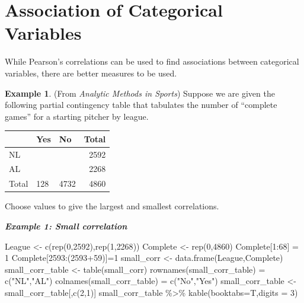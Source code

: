 \documentclass[
  11pt,
]{book}
\newenvironment{Shaded}{\begin{snugshade}}{\end{snugshade}}
\newcommand{\AttributeTok}[1]{\textcolor[rgb]{0.77,0.63,0.00}{#1}}
\newcommand{\DecValTok}[1]{\textcolor[rgb]{0.00,0.00,0.81}{#1}}
\newcommand{\FunctionTok}[1]{\textcolor[rgb]{0.00,0.00,0.00}{#1}}
\newcommand{\NormalTok}[1]{#1}
\newcommand{\OtherTok}[1]{\textcolor[rgb]{0.56,0.35,0.01}{#1}}
\newcommand{\SpecialCharTok}[1]{\textcolor[rgb]{0.00,0.00,0.00}{#1}}
\newcommand{\StringTok}[1]{\textcolor[rgb]{0.31,0.60,0.02}{#1}}
\theoremstyle{definition}
\theoremstyle{definition}
\newtheorem{example}{Example}[chapter]
\theoremstyle{definition}
\theoremstyle{definition}
\theoremstyle{remark}
\begin{document}
\newpage

\hypertarget{association-of-categorical-variables}{%
\section{Association of Categorical Variables}\label{association-of-categorical-variables}}

While Pearson's correlations can be used to find associations between categorical variables, there are better measures to be used.

\begin{example}
(From \emph{Analytic Methods in Sports}) Suppose we are given the following partial contingency table that tabulates the number of ``complete games'' for a starting pitcher by league.

\begin{tabular}{lllr}
\toprule
  & Yes & No & Total\\
\midrule
NL &  &  & 2592\\
AL &  &  & 2268\\
Total & 128 & 4732 & 4860\\
\bottomrule
\end{tabular}

Choose values to give the largest and smallest correlations.
\end{example}

\textbf{\emph{Example 1: Small correlation}}\\

\begin{Shaded}
\begin{Highlighting}[]
\NormalTok{League }\OtherTok{\textless{}{-}} \FunctionTok{c}\NormalTok{(}\FunctionTok{rep}\NormalTok{(}\DecValTok{0}\NormalTok{,}\DecValTok{2592}\NormalTok{),}\FunctionTok{rep}\NormalTok{(}\DecValTok{1}\NormalTok{,}\DecValTok{2268}\NormalTok{))}
\NormalTok{Complete }\OtherTok{\textless{}{-}} \FunctionTok{rep}\NormalTok{(}\DecValTok{0}\NormalTok{,}\DecValTok{4860}\NormalTok{)}
\NormalTok{Complete[}\DecValTok{1}\SpecialCharTok{:}\DecValTok{68}\NormalTok{] }\OtherTok{=} \DecValTok{1}
\NormalTok{Complete[}\DecValTok{2593}\SpecialCharTok{:}\NormalTok{(}\DecValTok{2593}\SpecialCharTok{+}\DecValTok{59}\NormalTok{)]}\OtherTok{=}\DecValTok{1}
\NormalTok{small\_corr }\OtherTok{\textless{}{-}} \FunctionTok{data.frame}\NormalTok{(League,Complete)}
\NormalTok{small\_corr\_table }\OtherTok{\textless{}{-}} \FunctionTok{table}\NormalTok{(small\_corr)}
\FunctionTok{rownames}\NormalTok{(small\_corr\_table) }\OtherTok{=} \FunctionTok{c}\NormalTok{(}\StringTok{"NL"}\NormalTok{,}\StringTok{"AL"}\NormalTok{)}
\FunctionTok{colnames}\NormalTok{(small\_corr\_table) }\OtherTok{=} \FunctionTok{c}\NormalTok{(}\StringTok{"No"}\NormalTok{,}\StringTok{"Yes"}\NormalTok{)}
\NormalTok{small\_corr\_table }\OtherTok{\textless{}{-}}\NormalTok{ small\_corr\_table[,}\FunctionTok{c}\NormalTok{(}\DecValTok{2}\NormalTok{,}\DecValTok{1}\NormalTok{)]}
\NormalTok{small\_corr\_table }\SpecialCharTok{\%\textgreater{}\%} \FunctionTok{kable}\NormalTok{(}\AttributeTok{booktabs=}\NormalTok{T,}\AttributeTok{digits =} \DecValTok{3}\NormalTok{)}
\end{Highlighting}
\end{Shaded}
\end{document}
